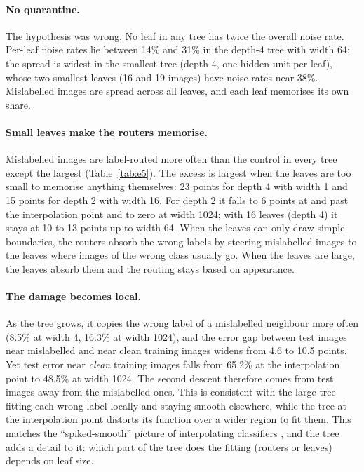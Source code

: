 \paragraph{No quarantine.} The hypothesis was wrong. No leaf in any tree has twice the overall noise rate. Per-leaf noise rates lie between 14\% and 31\% in the depth-4 tree with width 64; the spread is widest in the smallest tree (depth 4, one hidden unit per leaf), whose two smallest leaves (16 and 19 images) have noise rates near 38\%. Mislabelled images are spread across all leaves, and each leaf memorises its own share.

\paragraph{Small leaves make the routers memorise.} Mislabelled images are label-routed more often than the control in every tree except the largest (Table~\ref{tab:e5}). The excess is largest when the leaves are too small to memorise anything themselves: 23 points for depth 4 with width 1 and 15 points for depth 2 with width 16. For depth 2 it falls to 6 points at and past the interpolation point and to zero at width 1024; with 16 leaves (depth 4) it stays at 10 to 13 points up to width 64. When the leaves can only draw simple boundaries, the routers absorb the wrong labels by steering mislabelled images to the leaves where images of the wrong class usually go. When the leaves are large, the leaves absorb them and the routing stays based on appearance.

\paragraph{The damage becomes local.} As the tree grows, it copies the wrong label of a mislabelled neighbour more often (8.5\% at width 4, 16.3\% at width 1024), and the error gap between test images near mislabelled and near clean training images widens from 4.6 to 10.5 points. Yet test error near \emph{clean} training images falls from 65.2\% at the interpolation point to 48.5\% at width 1024. The second descent therefore comes from test images away from the mislabelled ones. This is consistent with the large tree fitting each wrong label locally and staying smooth elsewhere, while the tree at the interpolation point distorts its function over a wider region to fit them. This matches the ``spiked-smooth'' picture of interpolating classifiers \cite{wyner2017}, and the tree adds a detail to it: which part of the tree does the fitting (routers or leaves) depends on leaf size.
